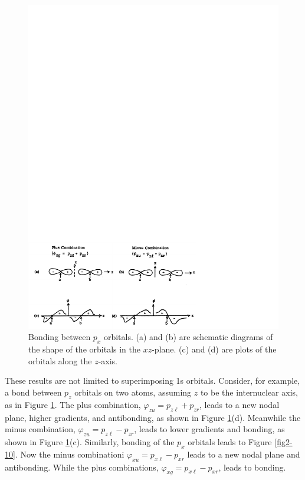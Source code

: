 \begin{figure}
\includegraphics[scale=0.75]{fig2-09}
\caption{Bonding between $p_x$ orbitals. (a) and (b) are schematic
  diagrams of the shape of the orbitals in the $xz$-plane. (c) and (d)
  are plots of the orbitals along the $z$-axis.}
\label{fig2-9}
\end{figure}

These results are not limited to superimposing 1s orbitals. Consider,
for example, a bond between $p_z$ orbitals on two atoms, assuming $z$
to be the internuclear axis, as in Figure \ref{fig2-9}.  The plus
combination, $\varphi_{zu} = p_{z \ell} + p_{zr}$, leads to a new nodal
plane, higher gradients, and antibonding, as shown in Figure
\ref{fig2-9}(d). Meanwhile the minus combination, $\varphi_{zu} = p_{z
\ell} - p_{zr}$, leads to lower gradients and bonding, as shown in
Figure \ref{fig2-9}(c).  Similarly, bonding of the $p_x$ orbitals
leads to Figure \ref{fig2-10}. Now the minus combinationi
$\varphi_{xu} = p_{x \ell} - p_{xr}$ leads to a new nodal plane and
antibonding. While the plus combinations, $\varphi_{xg} = p_{x \ell} -
p_{xr}$, leads to bonding.

